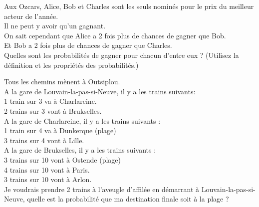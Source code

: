 { \newpage

 Aux Ozcars, Alice, Bob et Charles sont les seuls nominés pour le prix du meilleur acteur de l'année.\\
 Il ne peut y avoir qu'un gagnant.\\
 On sait cependant que Alice a 2 fois plus de chances de gagner que Bob.\\
 Et Bob a 2 fois plus de chances de gagner que Charles.\\
 Quelles sont les probabilités de gagner pour chacun d'entre eux ?
 (Utilisez la définition et les propriétés des probabilités.)

\newpage
Tous les chemins mènent à Outsiplou.\\
A la gare de Louvain-la-pas-si-Neuve, il y a les trains suivants:\\
1 train sur 3 va à Charlareine.\\
2 trains sur 3 vont à Brukselles.\\

A la gare de Charlareine, il y a les trains suivants :\\
1 train sur 4 va à Dunkerque (plage)\\
3 trains sur 4 vont à Lille.\\

A la gare de Brukselles, il y a les trains suivants :\\
3 trains sur 10 vont à Ostende (plage)\\
4 trains sur 10 vont à Paris.\\
3 trains sur 10 vont à Arlon.\\

Je voudrais prendre 2 trains à l'aveugle d'affilée en démarrant à Louvain-la-pas-si-Neuve, 
quelle est la probabilité que ma destination finale soit à la plage ?





}



